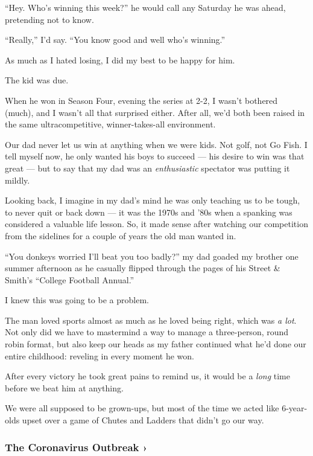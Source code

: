``Hey. Who's winning this week?'' he would call any Saturday he was
ahead, pretending not to know.

``Really,'' I'd say. ``You know good and well who's winning.''

As much as I hated losing, I did my best to be happy for him.

The kid was due.

When he won in Season Four, evening the series at 2-2, I wasn't bothered
(much), and I wasn't all that surprised either. After all, we'd both
been raised in the same ultracompetitive, winner-takes-all environment.

Our dad never let us win at anything when we were kids. Not golf, not Go
Fish. I tell myself now, he only wanted his boys to succeed --- his
desire to win was that great --- but to say that my dad was an
\emph{enthusiastic} spectator was putting it mildly.

Looking back, I imagine in my dad's mind he was only teaching us to be
tough, to never quit or back down --- it was the 1970s and '80s when a
spanking was considered a valuable life lesson. So, it made sense after
watching our competition from the sidelines for a couple of years the
old man wanted in.

``You donkeys worried I'll beat you too badly?'' my dad goaded my
brother one summer afternoon as he casually flipped through the pages of
his Street \& Smith's ``College Football Annual.''

I knew this was going to be a problem.

The man loved sports almost as much as he loved being right, which was
\emph{a lot}. Not only did we have to mastermind a way to manage a
three-person, round robin format, but also keep our heads as my father
continued what he'd done our entire childhood: reveling in every moment
he won.

After every victory he took great pains to remind us, it would be a
\emph{long} time before we beat him at anything.

We were all supposed to be grown-ups, but most of the time we acted like
6-year-olds upset over a game of Chutes and Ladders that didn't go our
way.

\href{https://www.nytimes3xbfgragh.onion/news-event/coronavirus?action=click\&pgtype=Article\&state=default\&region=MAIN_CONTENT_3\&context=storylines_faq}{}

\hypertarget{the-coronavirus-outbreak-}{%
\subsubsection{The Coronavirus Outbreak
›}\label{the-coronavirus-outbreak-}}

